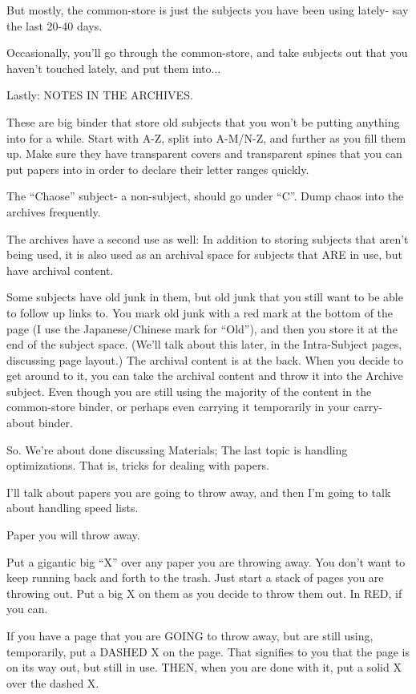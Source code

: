 \documentclass[oneside]{book}
\begin{document}
But mostly, the common-store is just the subjects you have been using
lately- say the last 20-40 days.

Occasionally, you'll go through the common-store, and take subjects
out that you haven't touched lately, and put them into...

Lastly: NOTES IN THE ARCHIVES.

These are big binder that store old subjects that you won't be putting
anything into for a while. Start with A-Z, split into A-M/N-Z, and
further as you fill them up. Make sure they have transparent covers
and transparent spines that you can put papers into in order to
declare their letter ranges quickly.

The ``Chaose'' subject- a non-subject, should go under ``C''. Dump chaos
into the archives frequently.

The archives have a second use as well: In addition to storing
subjects that aren't being used, it is also used as an archival space
for subjects that ARE in use, but have archival content.

Some subjects have old junk in them, but old junk that you still want
to be able to follow up links to. You mark old junk with a red mark at
the bottom of the page (I use the Japanese/Chinese mark for ``Old''),
and then you store it at the end of the subject space. (We'll talk
about this later, in the Intra-Subject pages, discussing page layout.)
The archival content is at the back. When you decide to get around to
it, you can take the archival content and throw it into the Archive
subject. Even though you are still using the majority of the content
in the common-store binder, or perhaps even carrying it temporarily in
your carry-about binder.


So. We're about done discussing Materials; The last topic is handling
optimizations. That is, tricks for dealing with papers.

I'll talk about papers you are going to throw away, and then I'm going
to talk about handling speed lists.

Paper you will throw away.

Put a gigantic big ``X'' over any paper you are throwing away. You don't
want to keep running back and forth to the trash. Just start a stack
of pages you are throwing out. Put a big X on them as you decide to
throw them out. In RED, if you can.

If you have a page that you are GOING to throw away, but are still
using, temporarily, put a DASHED X on the page. That signifies to you
that the page is on its way out, but still in use. THEN, when you are
done with it, put a solid X over the dashed X.
\end{document}
